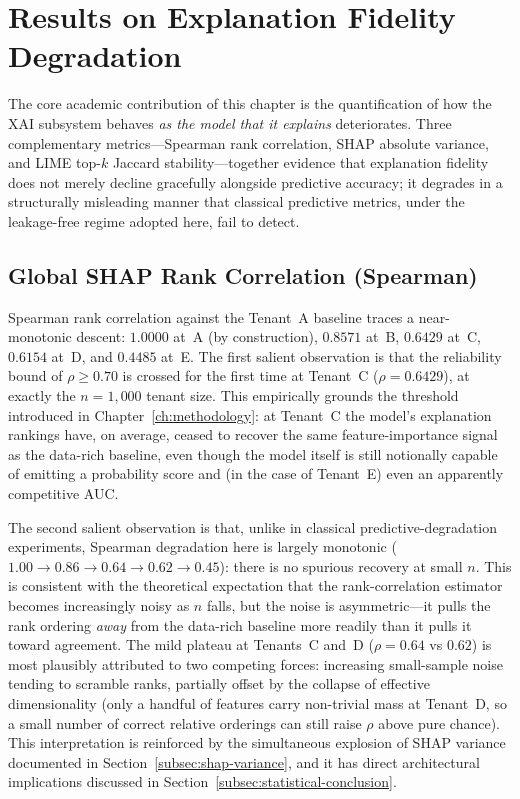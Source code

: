\section{Results on Explanation Fidelity Degradation}
\label{sec:results-fidelity}

The core academic contribution of this chapter is the quantification of how
the XAI subsystem behaves \emph{as the model that it explains} deteriorates.
Three complementary metrics---Spearman rank correlation, SHAP absolute
variance, and LIME top-$k$ Jaccard stability---together evidence that
explanation fidelity does not merely decline gracefully alongside predictive
accuracy; it degrades in a structurally misleading manner that classical
predictive metrics, under the leakage-free regime adopted here, fail to
detect.

\subsection{Global SHAP Rank Correlation (Spearman)}
\label{subsec:spearman}

Spearman rank correlation against the Tenant~A baseline traces a
near-monotonic descent: $1.0000$ at~A (by construction), $0.8571$ at~B,
$0.6429$ at~C, $0.6154$ at~D, and $0.4485$ at~E. The first salient
observation is that the reliability bound of $\rho \ge 0.70$ is crossed for
the first time at Tenant~C ($\rho = 0.6429$), at exactly the $n = 1{,}000$
tenant size. This empirically grounds the threshold introduced in
Chapter~\ref{ch:methodology}: at Tenant~C the model's explanation rankings
have, on average, ceased to recover the same feature-importance signal as
the data-rich baseline, even though the model itself is still notionally
capable of emitting a probability score and (in the case of Tenant~E)
even an apparently competitive AUC.

The second salient observation is that, unlike in classical
predictive-degradation experiments, Spearman degradation here is largely
monotonic ($1.00 \to 0.86 \to 0.64 \to 0.62 \to 0.45$): there is no
spurious recovery at small $n$. This is consistent with the theoretical
expectation that the rank-correlation estimator becomes increasingly noisy
as $n$ falls, but the noise is asymmetric---it pulls the rank ordering
\emph{away} from the data-rich baseline more readily than it pulls it
toward agreement. The mild plateau at Tenants~C and~D ($\rho = 0.64$ vs
$0.62$) is most plausibly attributed to two competing forces: increasing
small-sample noise tending to scramble ranks, partially offset by the
collapse of effective dimensionality (only a handful of features carry
non-trivial mass at Tenant~D, so a small number of correct relative
orderings can still raise $\rho$ above pure chance). This interpretation is
reinforced by the simultaneous explosion of SHAP variance documented in
Section~\ref{subsec:shap-variance}, and it has direct architectural
implications discussed in Section~\ref{subsec:statistical-conclusion}.


